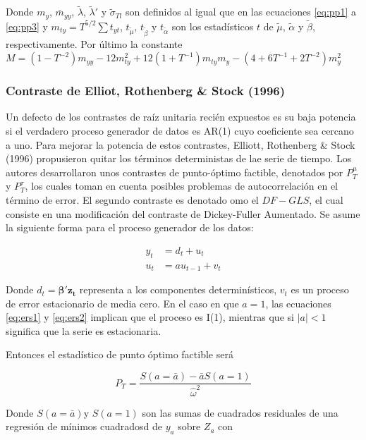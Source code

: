 \documentclass[12pt, twoside]{book}\usepackage[]{graphicx}\usepackage[]{color}
\numberwithin{equation}{section}
\numberwithin{theorem}{section}
\numberwithin{teorema}{section}
\numberwithin{defi}{section}
\numberwithin{prop}{section}
\numberwithin{defi}{section}
\theoremstyle{plain}
\begin{document}
Donde $m_{y}$, $\bar{m}_{yy}$, $\tilde{\lambda}$, $\tilde{\lambda}'$ y $\tilde{\sigma}_{Tl}$ son definidos al igual que en las ecuaciones \ref{eq:pp1} a \ref{eq:pp3} y $m_{ty}=T^{5/2}\sum t_{yt}$, $t_{\tilde{\mu}}$, $t_{\tilde{\beta}}$ y $t_{\tilde{\alpha}}$ son los estadísticos $t$ de $\tilde{\mu}$, $\tilde{\alpha}$ y $\tilde{\beta}$, respectivamente. Por último la constante $M=(1-T^{-2})m_{yy}-12m^{2}_{ty}+12(1+T^{-1})m_{ty}m_{y}-(4+6T^{-1}+2T^{-2})m_{y}^{2}$

\subsubsection{Contraste de Elliot, Rothenberg \& Stock (1996)} 

Un defecto de los contrastes de raíz unitaria recién expuestos es su baja potencia si el verdadero proceso generador de datos es AR(1) cuyo coeficiente sea cercano a uno. Para mejorar la potencia de estos contrastes, Elliott, Rothenberg \& Stock (1996) propusieron quitar los términos deterministas de lae  serie de tiempo. Los autores desarrollaron unos contrastes de punto-óptimo factible, denotados por $P^{\mu}_{T}$ y $P^{\tau}_{T}$, los cuales toman en cuenta posibles problemas de autocorrelación en el término de error. El segundo contraste es denotado omo el $DF-GLS$, el cual consiste en una modificación del contraste de Dickey-Fuller Aumentado. Se asume la siguiente forma para el proceso generador de los datos: 

\begin{align}
y_{t} & = d_{t}+u_{t} \label{eq:ers1}\\ 
u_{t} & = a u_{t-1}+v_{t} \label{eq:ers2}
\end{align}

Donde $d_{t}=\boldsymbol{\beta' z_{t}}$ representa a los componentes determinísticos, $v_{t}$ es un proceso de error estacionario de media cero. En el caso en que $a=1$, las ecuaciones  \ref{eq:ers1} y \ref{eq:ers2} implican que el proceso es I(1), mientras que si $|a|<1$ significa que la serie es estacionaria. 

Entonces el estadístico de punto óptimo factible será 

\begin{equation}
P_{T} = \frac{S(a=\bar{a})-\bar{a}S(a=1)}{\hat{\omega}^{2}}
\end{equation}

Donde $S(a=\bar{a})$y $S(a=1)$ son las sumas de cuadrados residuales de una regresión de mínimos cuadradosd de $y_{a}$ sobre $Z_{a}$ con 
\end{document}
